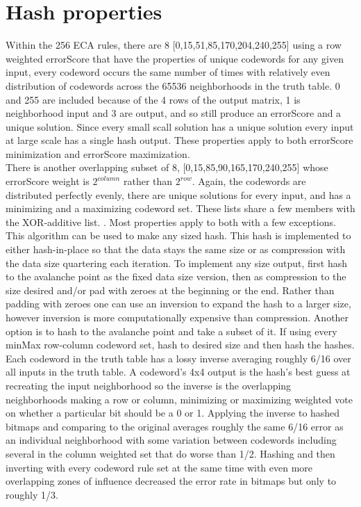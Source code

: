 \documentclass[11pt]{article}
\begin{document}
\section{Hash properties}

Within the 256 ECA rules, there are 8 [0,15,51,85,170,204,240,255] using a row weighted errorScore that have the properties of unique codewords for any given input, every codeword occurs the same number of times with relatively even distribution of codewords across the 65536 neighborhoods in the truth table. 0 and 255 are included because of the 4 rows of the output matrix, 1 is neighborhood input and 3 are output, and so still produce an errorScore and a unique solution. Since every small scall solution has a unique solution every input at large scale has a single hash output. These properties apply to both errorScore minimization and errorScore maximization. \\

There is another overlapping subset of 8, [0,15,85,90,165,170,240,255] whose errorScore weight is $2^{column}$ rather than $2^{row}$. Again, the codewords are distributed perfectly evenly, there are unique solutions for every input, and has a minimizing and a maximizing codeword set. These lists share a few members with the XOR-additive list. \cite{xorAdditive}. Most properties apply to both with a few exceptions.\\

This algorithm can be used to make any sized hash. This hash is implemented to either hash-in-place so that the data stays the same size or as compression with the data size quartering each iteration. To implement any size output, first hash to the avalanche point as the fixed data size version, then as compression to the size desired and/or pad with zeroes at the beginning or the end. Rather than padding with zeroes one can use an inversion to expand the hash to a larger size, however inversion is more computationally expensive than compression. Another option is to hash to the avalanche point and take a subset of it. If using every minMax row-column codeword set, hash to desired size and then hash the hashes.\\

Each codeword in the truth table has a lossy inverse averaging roughly 6/16 over all inputs in the truth table. A codeword's 4x4 output is the hash's best guess at recreating the input neighborhood so the inverse is the overlapping neighborhoods making a row or column, minimizing or maximizing weighted vote on whether a particular bit should be a 0 or 1. Applying the inverse to hashed bitmaps and comparing to the original averages roughly the same 6/16 error as an individual neighborhood with some variation between codewords including several in the column weighted set that do worse than 1/2. Hashing and then inverting with every codeword rule set at the same time with even more overlapping zones of influence decreased the error rate in bitmaps but only to roughly 1/3. \\
\end{document}
